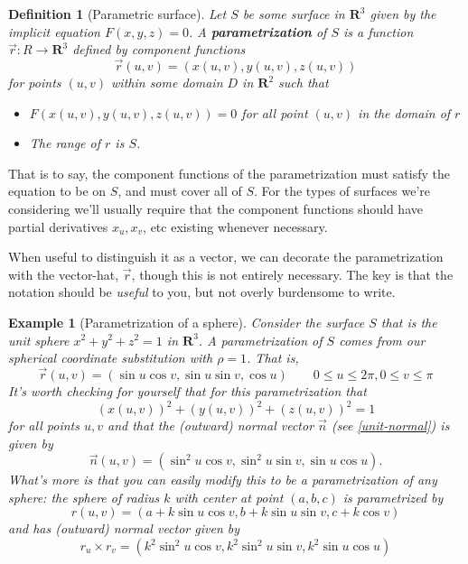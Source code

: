 \documentclass[12pt]{article}
\numberwithin{equation}{subsection}
\numberwithin{figure}{subsection}
\newtheorem{defn}[subsection]{Definition}
\theoremstyle{note}
\newtheorem{example}[subsection]{Example}
\begin{document}
{\begin{defn}[Parametric surface] Let $S$ be some surface in $\mathbf{R}^3$ given by the implicit equation $F(x,y,z)=0$. A \textbf{parametrization} of $S$ is a function $\vec{r}\colon R\to \mathbf{R}^3$ defined by component functions \begin{equation} \vec{r}(u,v)=\left(x(u,v), y(u,v), z(u,v)\right)\end{equation}
for points $(u,v)$ within some domain $D$ in $\mathbf{R}^2$ such that \begin{itemize}
\item  $F(x(u,v),y(u,v),z(u,v))=0$ for all point $(u,v)$ in the domain of $r$
\item The range of $r$ is $S$. 
\end{itemize}
\end{defn}
That is to say, the component functions of the parametrization must satisfy the equation to be on $S$, and must cover all of $S$. For the types of surfaces we're considering we'll usually require that the component functions should have partial derivatives $x_u,x_v$, etc existing whenever necessary. 

When useful to distinguish it as a vector, we can decorate the parametrization with the vector-hat, $\vec{r}$, though this is not entirely necessary. The key is that the notation should be \textit{useful} to you, but not overly burdensome to write.

\begin{example}[Parametrization of a sphere] Consider the surface $S$ that is the unit sphere $x^2+y^2+z^2=1$ in $\mathbf{R}^3$. A parametrization of $S$ comes from our spherical coordinate substitution with $\rho=1$. That is, \begin{equation} \vec{r}(u,v)=(\sin u\cos v, \sin u\sin v, \cos u) \qquad 0\leq u\leq 2\pi, 0 \leq v \leq \pi\end{equation}
It's worth checking for yourself that for this parametrization that  \[(x(u,v))^2+(y(u,v))^2+(z(u,v))^2=1\] for all points $u,v$ and that the (outward) normal vector $\vec{n}$ (see \eqref{unit-normal}) is given by \begin{equation} \vec{n}(u,v)=(\sin^2 u\cos v, \sin^2 u\sin v, \sin u\cos u).\end{equation} What's more is that you can easily modify this to be a parametrization of any sphere: the sphere of radius $k$ with center at point $(a,b,c)$ is parametrized by \begin{equation} r(u,v)=(a+k\sin u \cos v, b+k\sin u \sin v, c+k\cos v)\end{equation} and has (outward) normal vector given by \begin{equation} r_u\times r_v= (k^2\sin^2 u\cos v, k^2\sin^2 u\sin v, k^2\sin u\cos u)
\end{equation}
\end{example}

}
\end{document}
